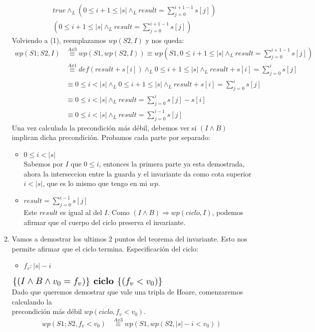 \documentclass{article}
\begin{document}
\begin{enumerate}[label=\alph*)]
\begin{align*}
		&true\wedge_L (0\leq i+1\leq |s| \wedge_L result=\sum_{j=0}^{i+1-1}s[j])\\
		& (0\leq i+1\leq |s| \wedge_L result=\sum_{j=0}^{i+1-1}s[j])
	\end{align*}
	Volviendo a (1), reemplazamos $wp(S2,I)$ y nos queda:
	\begin{align*}
	wp(S1;S2,I)&\stackrel{Ax3}{\equiv}wp(S1,wp(S2,I))\equiv wp(S1,0\leq i+1\leq |s| \wedge_L result=\sum_{j=0}^{i+1-1}s[j])\\
		&\stackrel{Ax1}{\equiv}def(result+s[i])\wedge_L 0\leq i+1\leq |s| \wedge_L result+s[i]=\sum_{j=0}^{i}s[j]\\
		&\equiv 0\leq i<|s|\wedge_L 0\leq i+1\leq |s| \wedge_L result+s[i]=\sum_{j=0}^{i}s[j]\\
		&\equiv 0\leq i<|s| \wedge_L result=\sum_{j=0}^{i}s[j]-s[i]\\
		&\equiv 0\leq i<|s| \wedge_L result=\sum_{j=0}^{i-1}s[j]
	\end{align*}
	Una vez calculada la precondición más débil, debemos ver si $(I\wedge B)$ implican dicha precondición. Probamos cada
	parte por separado:
	\begin{itemize}
		\item $ 0\leq i< |s|$\smallskip \\
		Sabemos por $I$ que $0\leq i$, entonces la primera parte ya esta demostrada, ahora la interseccion entre la guarda
		y el invariante da como cota superior $i<|s|$, que es lo mismo que tengo en mi $wp$.
		\item $result=\sum_{j=0}^{i-1}s[j]$\smallskip \\
		Este $result$ es igual al del $I$.
		Como $(I\wedge B) \Rightarrow wp(ciclo,I)$, podemos afirmar que el cuerpo del ciclo preserva el invariante.
	\end{itemize}
	\item 
	Vamos  a demostrar los ultimos 2 puntos del teorema del invariante. Esto nos permite afirmar que el ciclo termina. Especificación del ciclo:
	\begin{itemize}
	\item $f_v:|s|-i$
	\end{itemize}
	$\scalebox{1.3}{$\{(I\wedge B\wedge v_0=f_v)\}\textbf{ ciclo }\{(f_v<v_0)\}$}$\medskip \\
	Dado que queremos demostrar que vale una tripla de Hoare, comenzaremos calculando la\\ precondición más débil $wp(ciclo,f_v<v_0)$.
	\begin{align*}
		wp(S1;S2,f_v<v_0)&\stackrel{Ax3}{\equiv}wp(S1,wp(S2,|s|-i<v_0))\\

\end{align*}
\end{enumerate}
\end{document}

